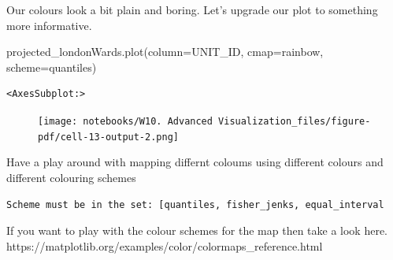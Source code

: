 \documentclass[
  letterpaper,
  DIV=11,
  numbers=noendperiod]{scrreprt}
\newenvironment{Shaded}{\begin{snugshade}}{\end{snugshade}}
\newcommand{\NormalTok}[1]{\textcolor[rgb]{0.00,0.23,0.31}{#1}}
\newcommand{\OperatorTok}[1]{\textcolor[rgb]{0.37,0.37,0.37}{#1}}
\newcommand{\StringTok}[1]{\textcolor[rgb]{0.13,0.47,0.30}{#1}}
\begin{document}
Our colours look a bit plain and boring. Let's upgrade our plot to
something more informative.

\begin{Shaded}
\begin{Highlighting}[]
\NormalTok{projected\_londonWards.plot(column}\OperatorTok{=}\StringTok{\textquotesingle{}UNIT\_ID\textquotesingle{}}\NormalTok{, cmap}\OperatorTok{=}\StringTok{\textquotesingle{}rainbow\textquotesingle{}}\NormalTok{, scheme}\OperatorTok{=}\StringTok{\textquotesingle{}quantiles\textquotesingle{}}\NormalTok{)}
\end{Highlighting}
\end{Shaded}

\begin{verbatim}
<AxesSubplot:>
\end{verbatim}

\begin{figure}[H]

{\centering \texttt{[image: notebooks/W10. Advanced Visualization\_files/figure-pdf/cell-13-output-2.png]}

}

\end{figure}

Have a play around with mapping differnt coloums using different colours
and different colouring schemes

\texttt{Scheme\ must\ be\ in\ the\ set:\ {[}\textquotesingle{}quantiles\textquotesingle{},\ \textquotesingle{}fisher\_jenks\textquotesingle{},\ \textquotesingle{}equal\_interval\textquotesingle{}{]}}

If you want to play with the colour schemes for the map then take a look
here. https://matplotlib.org/examples/color/colormaps\_reference.html
\end{document}
